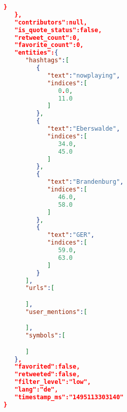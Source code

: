 \begin{lstlisting}[language=json,firstnumber=1]
      }
   },
   "contributors":null,
   "is_quote_status":false,
   "retweet_count":0,
   "favorite_count":0,
   "entities":{  
      "hashtags":[  
         {  
            "text":"nowplaying",
            "indices":[  
               0.0,
               11.0
            ]
         },
         {  
            "text":"Eberswalde",
            "indices":[  
               34.0,
               45.0
            ]
         },
         {  
            "text":"Brandenburg",
            "indices":[  
               46.0,
               58.0
            ]
         },
         {  
            "text":"GER",
            "indices":[  
               59.0,
               63.0
            ]
         }
      ],
      "urls":[  

      ],
      "user_mentions":[  

      ],
      "symbols":[  

      ]
   },
   "favorited":false,
   "retweeted":false,
   "filter_level":"low",
   "lang":"de",
   "timestamp_ms":"1495113303140"
}
\end{lstlisting}